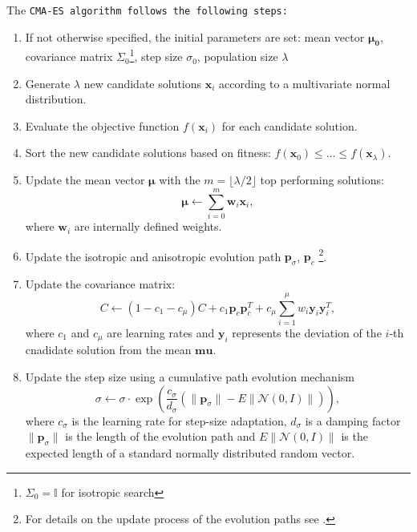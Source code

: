The \tt{CMA-ES} algorithm follows the following steps:\begin{enumerate}
    \item If not otherwise specified, the initial parameters are set: mean vector $\mathbf{\mu_0}$, covariance matrix $\Sigma_0$\footnote{$\Sigma_0=\mathbb{I}$ for isotropic search}, step size $\sigma_0$, population size $\lambda$
    \item Generate $\lambda$ new candidate solutions $\mathbf{x}_i$ according to a multivariate normal distribution.
    \item Evaluate the objective function $f(\mathbf{x}_i)$ for each candidate solution.
    \item Sort the new candidate solutions based on fitness: $f(\mathbf{x}_0) \leq ... \leq f(\mathbf{x}_{\lambda})$.
    \item Update the mean vector $\mathbf{\mu}$ with the $m=\lfloor \lambda / 2 \rfloor$ top performing solutions:\begin{equation}
        \mathbf{\mu} \leftarrow \sum_{i=0}^m \mathbf{w}_i\mathbf{x}_i,
    \end{equation} where $\mathbf{w}_i$ are internally defined weights.
    \item Update the isotropic and anisotropic evolution path $\mathbf{p}_{\sigma}$, $\mathbf{p}_c$ \footnote{For details on the update process of the evolution paths see \cite{cmaessimplepractical}.}.
    \item Update the covariance matrix: \begin{equation}
        C \leftarrow (1 - c_1 - c_{\mu}) C + c_1 \mathbf{p}_c \mathbf{p}_c^T + c_{\mu} \sum_{i=1}^{\mu} w_i \mathbf{y}_i \mathbf{y}_i^T,
    \end{equation} where $c_1$ and $c_\mu$ are learning rates and $\mathbf{y}_i$ represents the deviation of the $i$-th cnadidate solution from the mean $\mathbf{mu}$.
    \item Update the step size using a cumulative path evolution mechanism \begin{equation}
        \sigma \leftarrow \sigma \cdot \exp \left( \frac{c_{\sigma}}{d_{\sigma}} \left( \| \mathbf{p}_{\sigma} \| - E \| \mathcal{N}(0, I) \| \right) \right),
    \end{equation} where $c_\sigma$ is the learning rate for step-size adaptation, $d_\sigma$ is a damping factor $\| \mathbf{p}_{\sigma} \|$ is the length of the evolution path and $E \| \mathcal{N}(0, I) \|$ is the expected length of a standard normally distributed random vector.
\end{enumerate}

